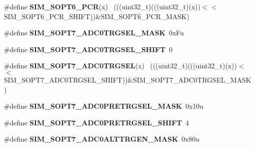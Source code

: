 \begin{DoxyCompactItemize}
\item 
\hypertarget{group___s_i_m___register___masks_gab57bd94cb7620f55e8ac1894605ff4ea}{}\#define {\bfseries S\+I\+M\+\_\+\+S\+O\+P\+T6\+\_\+\+P\+C\+R}(x)                                              ~(((uint32\+\_\+t)(((uint32\+\_\+t)(x))$<$$<$S\+I\+M\+\_\+\+S\+O\+P\+T6\+\_\+\+P\+C\+R\+\_\+\+S\+H\+I\+F\+T))\&S\+I\+M\+\_\+\+S\+O\+P\+T6\+\_\+\+P\+C\+R\+\_\+\+M\+A\+S\+K)\label{group___s_i_m___register___masks_gab57bd94cb7620f55e8ac1894605ff4ea}

\item 
\hypertarget{group___s_i_m___register___masks_gaeda70babef834cacace2c775d62bb4ae}{}\#define {\bfseries S\+I\+M\+\_\+\+S\+O\+P\+T7\+\_\+\+A\+D\+C0\+T\+R\+G\+S\+E\+L\+\_\+\+M\+A\+S\+K}~0x\+Fu\label{group___s_i_m___register___masks_gaeda70babef834cacace2c775d62bb4ae}

\item 
\hypertarget{group___s_i_m___register___masks_ga914ced2a5cf4e7f37371d52d34d4a930}{}\#define {\bfseries S\+I\+M\+\_\+\+S\+O\+P\+T7\+\_\+\+A\+D\+C0\+T\+R\+G\+S\+E\+L\+\_\+\+S\+H\+I\+F\+T}~0\label{group___s_i_m___register___masks_ga914ced2a5cf4e7f37371d52d34d4a930}

\item 
\hypertarget{group___s_i_m___register___masks_ga3688192d4b3dce98ac9b670242a38b23}{}\#define {\bfseries S\+I\+M\+\_\+\+S\+O\+P\+T7\+\_\+\+A\+D\+C0\+T\+R\+G\+S\+E\+L}(x)                                ~(((uint32\+\_\+t)(((uint32\+\_\+t)(x))$<$$<$S\+I\+M\+\_\+\+S\+O\+P\+T7\+\_\+\+A\+D\+C0\+T\+R\+G\+S\+E\+L\+\_\+\+S\+H\+I\+F\+T))\&S\+I\+M\+\_\+\+S\+O\+P\+T7\+\_\+\+A\+D\+C0\+T\+R\+G\+S\+E\+L\+\_\+\+M\+A\+S\+K)\label{group___s_i_m___register___masks_ga3688192d4b3dce98ac9b670242a38b23}

\item 
\hypertarget{group___s_i_m___register___masks_ga74544c6c9d4fbc593884681ac79c796f}{}\#define {\bfseries S\+I\+M\+\_\+\+S\+O\+P\+T7\+\_\+\+A\+D\+C0\+P\+R\+E\+T\+R\+G\+S\+E\+L\+\_\+\+M\+A\+S\+K}~0x10u\label{group___s_i_m___register___masks_ga74544c6c9d4fbc593884681ac79c796f}

\item 
\hypertarget{group___s_i_m___register___masks_gaee870f942318f14376ee9e6d5558e2ff}{}\#define {\bfseries S\+I\+M\+\_\+\+S\+O\+P\+T7\+\_\+\+A\+D\+C0\+P\+R\+E\+T\+R\+G\+S\+E\+L\+\_\+\+S\+H\+I\+F\+T}~4\label{group___s_i_m___register___masks_gaee870f942318f14376ee9e6d5558e2ff}

\item 
\hypertarget{group___s_i_m___register___masks_ga6390cd75db35ecc6c5fc6d5b0d417a7d}{}\#define {\bfseries S\+I\+M\+\_\+\+S\+O\+P\+T7\+\_\+\+A\+D\+C0\+A\+L\+T\+T\+R\+G\+E\+N\+\_\+\+M\+A\+S\+K}~0x80u\label{group___s_i_m___register___masks_ga6390cd75db35ecc6c5fc6d5b0d417a7d}


\end{DoxyCompactItemize}
